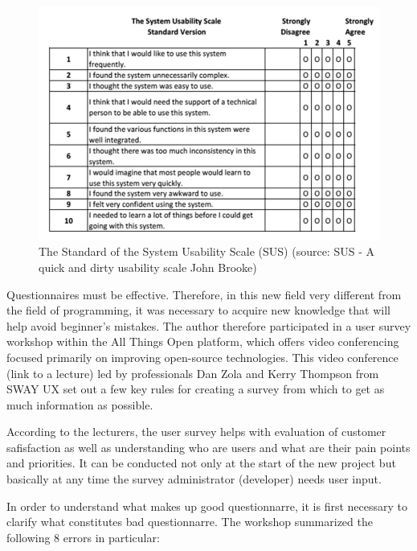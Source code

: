 \documentclass[a4paper,10pt,twoside]{article}
\begin{document}
\vspace{0.3cm}
\begin{figure}[hbt!] 
\begin{center}
\includegraphics[width=12cm]{../pictures/sus.png} 
\caption[The Standard of the System Usability Scale (SUS) ]{The Standard of the System Usability Scale (SUS) (source: SUS - A quick and dirty usability scale John Brooke)}
\label{fig:sus}
\end{center}
\end{figure}

Questionnaires must be effective. Therefore, in this new field very different from the field of programming, it was necessary to acquire new knowledge that will help avoid beginner's mistakes. The author therefore participated in a user survey workshop within the All Things Open platform, which offers video conferencing focused primarily on improving open-source technologies. This video conference (link to a lecture) led by professionals Dan Zola and Kerry Thompson from SWAY UX set out a few key rules for creating a survey from which to get as much information as possible.

According to the lecturers, the user survey helps with evaluation of customer safisfaction as well as understanding who are users and what are their pain points and priorities. It can be conducted not only at the start of the new project but basically at any time the survey administrator (developer) needs user input.

In order to understand what makes up good questionnarre, it is first necessary to clarify what constitutes bad questionnarre. The workshop summarized the following 8 errors in particular:
\end{document}
